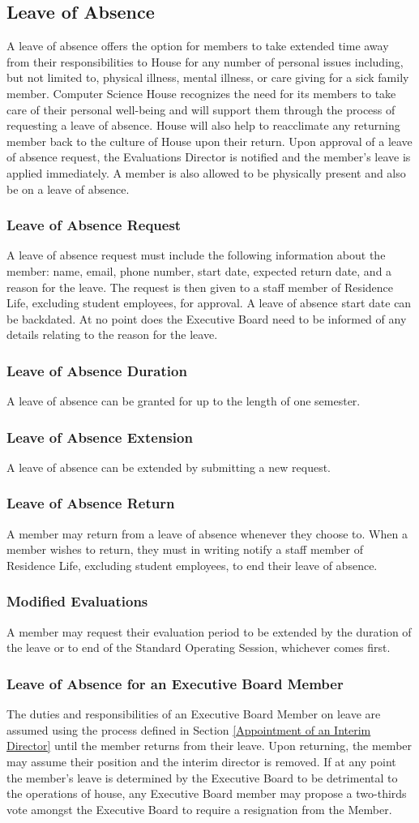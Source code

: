 \documentclass{article}
\newcommand{\asection}[1]{\subsection{#1} \label{#1}}
\newcommand{\asubsection}[1]{\subsubsection{#1} \label{#1}}
\begin{document}
\asection{Leave of Absence}
A leave of absence offers the option for members to take extended time away from their responsibilities to House for any number of personal issues including, but not limited to, physical illness, mental illness, or care giving for a sick family member.
Computer Science House recognizes the need for its members to take care of their personal well-being and will support them through the process of requesting a leave of absence.
House will also help to reacclimate any returning member back to the culture of House upon their return.
Upon approval of a leave of absence request, the Evaluations Director is notified and the member's leave is applied immediately.
A member is also allowed to be physically present and also be on a leave of absence.
\asubsection{Leave of Absence Request}
A leave of absence request must include the following information about the member: name, email, phone number, start date, expected return date, and a reason for the leave.
The request is then given to a staff member of Residence Life, excluding student employees, for approval.
A leave of absence start date can be backdated.
At no point does the Executive Board need to be informed of any details relating to the reason for the leave.
\asubsection{Leave of Absence Duration}
A leave of absence can be granted for up to the length of one semester.
\asubsection{Leave of Absence Extension}
A leave of absence can be extended by submitting a new request.
\asubsection{Leave of Absence Return}
A member may return from a leave of absence whenever they choose to.
When a member wishes to return, they must in writing notify a staff member of Residence Life, excluding student employees, to end their leave of absence.
\asubsection{Modified Evaluations}
A member may request their evaluation period to be extended by the duration of the leave or to end of the Standard Operating Session, whichever comes first.
\asubsection{Leave of Absence for an Executive Board Member}
The duties and responsibilities of an Executive Board Member on leave are assumed using the process defined in Section \ref{Appointment of an Interim Director} until the member returns from their leave.
Upon returning, the member may assume their position and the interim director is removed.
If at any point the member's leave is determined by the Executive Board to be detrimental to the operations of house, any Executive Board member may propose a two-thirds vote amongst the Executive Board to require a resignation from the Member.
\end{document}
